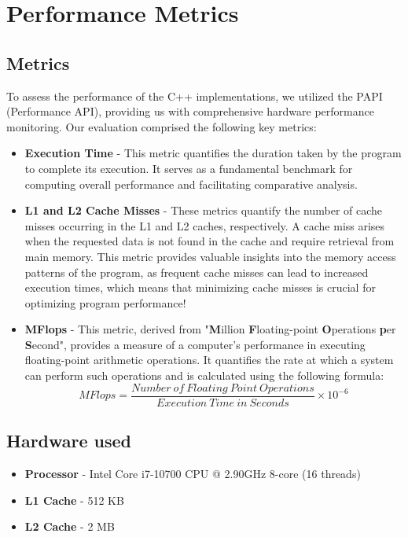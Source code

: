 \section{Performance Metrics}

\subsection{Metrics}
To assess the performance of the C++ implementations, we 
utilized the PAPI (Performance API), providing us with comprehensive 
hardware performance monitoring. Our evaluation comprised the 
following key metrics:

\begin{itemize}
\item \textbf{Execution Time} - This metric quantifies the 
duration taken by the program to 
complete its execution. It serves as a fundamental 
benchmark for computing overall performance 
and facilitating comparative analysis.

\item \textbf{L1 and L2 Cache Misses} - These metrics 
quantify the number of cache misses occurring in the 
L1 and L2 caches, respectively. A cache miss arises 
when the requested data is not found in the cache and 
require retrieval from main memory. This metric 
provides valuable insights into the memory access patterns
of the program, as frequent cache misses can lead to 
increased execution times, which means that 
minimizing cache misses is crucial for optimizing 
program performance!

\item \textbf{MFlops} - This metric, derived from "\textbf{M}illion 
\textbf{F}loating-point \textbf{O}perations \textbf{p}er \textbf{S}econd", provides a measure of a 
computer's performance in executing floating-point arithmetic 
operations. It quantifies the rate at which a system can 
perform such operations and is calculated using the following formula:
    \begin{equation}
        MFlops = \frac{Number\ of\ Floating\ Point\ Operations}{Execution\ Time\ in\ Seconds} \times 10^{-6}
    \end{equation}
\end{itemize}

\subsection{Hardware used}
\begin{itemize}
    \item \textbf{Processor} - Intel Core i7-10700 CPU @ 2.90GHz 8-core (16 threads)
    \item \textbf{L1 Cache} - 512 KB
    \item \textbf{L2 Cache} - 2 MB
\end{itemize}
